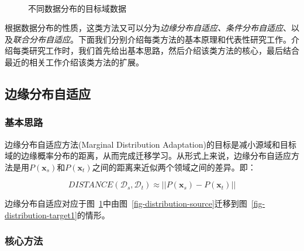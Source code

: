 \begin{figure}[htbp]
	~
	\caption{不同数据分布的目标域数据}
	\label{fig-distribution}
\end{figure}

根据数据分布的性质，这类方法又可以分为\textit{边缘分布自适应、条件分布自适应}、以及\textit{联合分布自适应}。下面我们分别介绍每类方法的基本原理和代表性研究工作。介绍每类研究工作时，我们首先给出基本思路，然后介绍该类方法的核心，最后结合最近的相关工作介绍该类方法的扩展。

\subsection{边缘分布自适应}

\subsubsection{基本思路}

边缘分布自适应方法(Marginal Distribution Adaptation)的目标是减小源域和目标域的边缘概率分布的距离，从而完成迁移学习。从形式上来说，边缘分布自适应方法是用$P(\mathbf{x}_s)$和$P(\mathbf{x}_t)$之间的距离来近似两个领域之间的差异。即：

\begin{equation}
	\label{eq-marginal-general}
	DISTANCE(\mathcal{D}_s,\mathcal{D}_t) \approx ||P(\mathbf{x}_s) - P(\mathbf{x}_t)||
\end{equation}

边缘分布自适应对应于图~\ref{fig-distribution}中由图~\ref{fig-distribution-source}迁移到图~\ref{fig-distribution-target1}的情形。

\subsubsection{核心方法}

